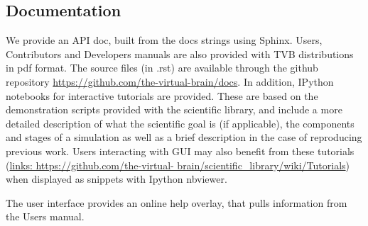 \subsection{Documentation}

We provide an API doc, built from the docs strings using Sphinx.
Users, Contributors and Developers manuals are also provided with TVB
distributions in pdf format. The source files (in .rst) are available
through the github repository \url{https://github.com/the-virtual-brain/docs}.  
In addition, IPython \cite{PerezGranger_2007} notebooks
for interactive tutorials are provided. These are based on the
demonstration scripts provided with the scientific library, and
include a more detailed description of what the scientific goal is (if
applicable), the components and stages of a simulation as well as a
brief description in the case of reproducing previous work. Users
interacting with \TVB GUI may also benefit from these tutorials
(\url{links: https://github.com/the-virtual-
brain/scientific_library/wiki/Tutorials}) when displayed as snippets
with Ipython nbviewer. 

The user interface provides an online help overlay, that pulls
information from the Users manual.


